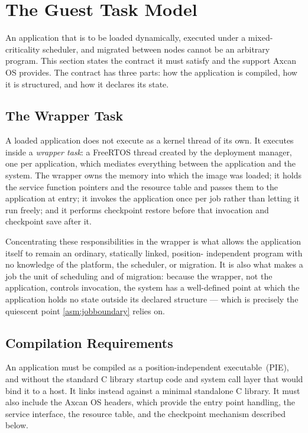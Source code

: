 \section{The Guest Task Model}\label{sec:os:guesttask}

An application that is to be loaded dynamically, executed under a
mixed-criticality scheduler, and migrated between nodes cannot be an arbitrary
program. This section states the contract it must satisfy and the support
Axcan OS provides. The contract has three parts: how the application is
compiled, how it is structured, and how it declares its state.

\subsection{The Wrapper Task}\label{subsec:os:wrapper}

A loaded application does not execute as a kernel thread of its own. It
executes inside a \emph{wrapper task}: a FreeRTOS thread created by the
deployment manager, one per application, which mediates everything between the
application and the system. The wrapper owns the memory into which the image
was loaded; it holds the service function pointers and the resource table and
passes them to the application at entry; it invokes the application once per
job rather than letting it run freely; and it performs checkpoint restore
before that invocation and checkpoint save after it.

Concentrating these responsibilities in the wrapper is what allows the
application itself to remain an ordinary, statically linked, position-
independent program with no knowledge of the platform, the scheduler, or
migration. It is also what makes a job the unit of scheduling and of
migration: because the wrapper, not the application, controls invocation, the
system has a well-defined point at which the application holds no state
outside its declared structure --- which is precisely the quiescent point
\cref{asm:jobboundary} relies on.

\subsection{Compilation Requirements}\label{subsec:os:compilation}

An application must be compiled as a position-independent executable~(PIE),
and without the standard C library startup code and system call layer that
would bind it to a host. It links instead against a minimal standalone C
library.
It must also include the Axcan OS headers, which provide the entry point
handling, the service interface, the resource table, and the checkpoint
mechanism described below.

